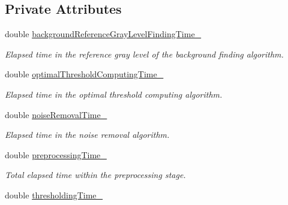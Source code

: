 \subsection*{Private Attributes}
\begin{CompactItemize}
\item 
\hypertarget{class_statistics_ac1d32288eac323391e66b2ff1a878e8}{
double \hyperlink{class_statistics_ac1d32288eac323391e66b2ff1a878e8}{backgroundReferenceGrayLevelFindingTime\_\-}}
\label{class_statistics_ac1d32288eac323391e66b2ff1a878e8}

\begin{CompactList}\small\item\em Elapsed time in the reference gray level of the background finding algorithm. \item\end{CompactList}\item 
\hypertarget{class_statistics_b8cb0f26533cee29b94f3a556b00e943}{
double \hyperlink{class_statistics_b8cb0f26533cee29b94f3a556b00e943}{optimalThresholdComputingTime\_\-}}
\label{class_statistics_b8cb0f26533cee29b94f3a556b00e943}

\begin{CompactList}\small\item\em Elapsed time in the optimal threshold computing algorithm. \item\end{CompactList}\item 
\hypertarget{class_statistics_acacd5443d740dda6ddd83deb777ec4b}{
double \hyperlink{class_statistics_acacd5443d740dda6ddd83deb777ec4b}{noiseRemovalTime\_\-}}
\label{class_statistics_acacd5443d740dda6ddd83deb777ec4b}

\begin{CompactList}\small\item\em Elapsed time in the noise removal algorithm. \item\end{CompactList}\item 
\hypertarget{class_statistics_91e724d9ef7b96e1df3310c61234ebbd}{
double \hyperlink{class_statistics_91e724d9ef7b96e1df3310c61234ebbd}{preprocessingTime\_\-}}
\label{class_statistics_91e724d9ef7b96e1df3310c61234ebbd}

\begin{CompactList}\small\item\em Total elapsed time within the preprocessing stage. \item\end{CompactList}\item 
\hypertarget{class_statistics_e830ef1e50443eda784cadb18ca2b0d1}{
double \hyperlink{class_statistics_e830ef1e50443eda784cadb18ca2b0d1}{thresholdingTime\_\-}}
\label{class_statistics_e830ef1e50443eda784cadb18ca2b0d1}


\end{CompactItemize}
